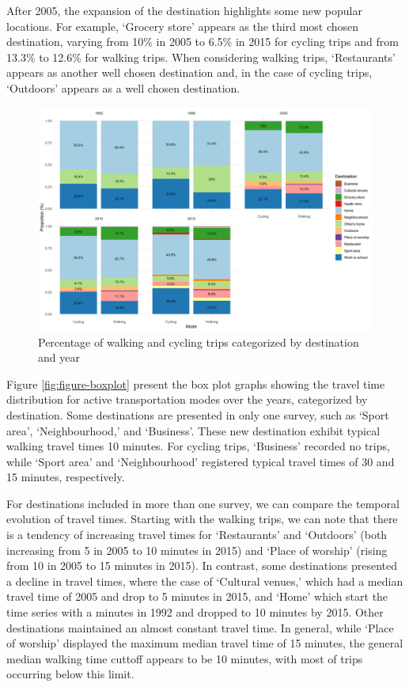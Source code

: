 \documentclass[preprint, 3p,
authoryear]{elsarticle} %
\begin{document}
After 2005, the expansion of the destination highlights some new popular
locations. For example, `Grocery store' appears as the third most chosen
destination, varying from 10\% in 2005 to 6.5\% in 2015 for cycling
trips and from 13.3\% to 12.6\% for walking trips. When considering
walking trips, `Restaurants' appears as another well chosen destination
and, in the case of cycling trips, `Outdoors' appears as a well chosen
destination.

\begin{figure}
\includegraphics[width=1\linewidth]{figures/destination_percentual} \caption{Percentage of walking and cycling trips categorized by destination and year}\label{fig:figure-destmodeyearperc}
\end{figure}

Figure \ref{fig:figure-boxplot} present the box plot graphs showing the
travel time distribution for active transportation modes over the years,
categorized by destination. Some destinations are presented in only one
survey, such as `Sport area', `Neighbourhood,' and `Business'. These new
destination exhibit typical walking travel times 10 minutes. For cycling
trips, `Business' recorded no trips, while `Sport area' and
`Neighbourhood' registered typical travel times of 30 and 15 minutes,
respectively.

For destinations included in more than one survey, we can compare the
temporal evolution of travel times. Starting with the walking trips, we
can note that there is a tendency of increasing travel times for
`Restaurants' and `Outdoors' (both increasing from 5 in 2005 to 10
minutes in 2015) and `Place of worship' (rising from 10 in 2005 to 15
minutes in 2015). In contrast, some destinations presented a decline in
travel times, where the case of `Cultural venues,' which had a median
travel time of 2005 and drop to 5 minutes in 2015, and `Home' which
start the time series with a minutes in 1992 and dropped to 10 minutes
by 2015. Other destinations maintained an almost constant travel time.
In general, while `Place of worship' displayed the maximum median travel
time of 15 minutes, the general median walking time cuttoff appears to
be 10 minutes, with most of trips occurring below this limit.
\end{document}

